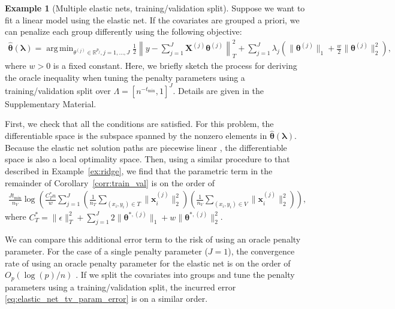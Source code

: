 \documentclass[12pt]{article} %
\theoremstyle{definition}
\newtheorem{example}{Example}
\DeclareMathOperator*{\argmin}{arg\,min}
\begin{document}
\begin{example}[Multiple elastic nets, training/validation split]
	\label{ex:elastic_net_tv}
	Suppose we want to fit a linear model using the elastic net.
	If the covariates are grouped a priori, we can penalize each group differently using the following objective:
	\begin{align}
	\hat{\boldsymbol{\theta}}(\boldsymbol{\lambda})
	=\argmin_{\theta^{(j)} \in \mathbb{R}^{p_j}, j = 1,...,J}
	\frac{1}{2} \left \| y - \sum_{j=1}^J \boldsymbol{X}^{(j)} \boldsymbol{\theta}^{(j)} \right \|_T^2
	+ \sum_{j=1}^J \lambda_j \left(
	\| \boldsymbol{\theta}^{(j)}\|_1
	+ \frac{w}{2} \| \boldsymbol{\theta}^{(j)}\|_2^2
	\right),
	\label{eq:elastic_net_ex}
	\end{align}
	where $w > 0$ is a fixed constant.
	Here, we briefly sketch the process for deriving the oracle inequality when tuning the penalty parameters using a training/validation split over $\Lambda = [n^{-t_{\min}}, 1]^J$.
	Details are given in the Supplementary Material.

	First, we check that all the conditions are satisfied.
	For this problem, the differentiable space is the subspace spanned by the nonzero elements in $\hat{\boldsymbol{\theta}}(\boldsymbol{\lambda})$.
	Because the elastic net solution paths are piecewise linear \citep{zou2003regression}, the differentiable space is also a local optimality space.
	Then, using a similar procedure to that described in Example~\ref{ex:ridge}, we find that the parametric term in the remainder of Corollary~\ref{corr:train_val} is on the order of
	\begin{align}
	\frac{J t_{\min}}{n_{V}}
	\log \left (
	\frac{C^*_T n}{w}
	\sum_{j=1}^J
	\left(\frac{1}{n_T} \sum_{(x_i, y_i) \in T} \|\boldsymbol{x}_i^{(j)}\|^2_2\right)
	\left(\frac{1}{n_V} \sum_{(x_i, y_i) \in V} \|\boldsymbol{x}_i^{(j)}\|^2_2\right)
	\right ),
	\label{eq:elastic_net_tv_param_error}
	\end{align}
	where
	$
	C^*_T =
	\|\epsilon\|_{T}^{2}
	+\sum_{j=1}^J
	2 \|\boldsymbol{\theta}^{*,(j)}\|_1
	+ w\|\boldsymbol{\theta}^{*,(j)}\|_2^2
	$.

	We can compare this additional error term to the risk of using an oracle penalty parameter.
	For the case of a single penalty parameter ($J = 1$), the convergence rate of using an oracle penalty parameter for the elastic net is on the order of $O_p(\log(p)/n)$ \citep{bunea2008honest, hebiri2011smooth}.
	If we split the covariates into groups and tune the penalty parameters using a training/validation split, the incurred error \eqref{eq:elastic_net_tv_param_error} is on a similar order.
\end{example}
\end{document}
